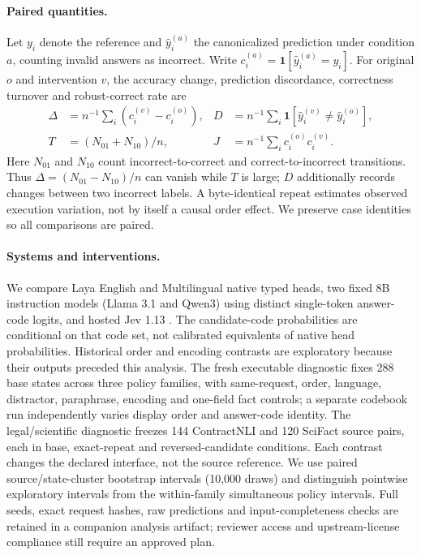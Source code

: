 \paragraph{Paired quantities.}
Let $y_i$ denote the reference and $\hat y_i^{(a)}$ the canonicalized prediction under condition $a$, counting invalid answers as incorrect. Write $c_i^{(a)}=\mathbf 1[\hat y_i^{(a)}=y_i]$. For original $o$ and intervention $v$, the accuracy change, prediction discordance, correctness turnover and robust-correct rate are
\begin{align}
\Delta &= n^{-1}\textstyle\sum_i(c_i^{(v)}-c_i^{(o)}), &
D &= n^{-1}\textstyle\sum_i\mathbf 1[\hat y_i^{(v)}\ne\hat y_i^{(o)}],\\
T &= (N_{01}+N_{10})/n, &
J &= n^{-1}\textstyle\sum_i c_i^{(o)}c_i^{(v)}.
\end{align}
Here $N_{01}$ and $N_{10}$ count incorrect-to-correct and correct-to-incorrect transitions. Thus $\Delta=(N_{01}-N_{10})/n$ can vanish while $T$ is large; $D$ additionally records changes between two incorrect labels. A byte-identical repeat estimates observed execution variation, not by itself a causal order effect. We preserve case identities so all comparisons are paired.

\paragraph{Systems and interventions.}
We compare Laya English and Multilingual native typed heads, two fixed 8B instruction models (Llama 3.1 and Qwen3) using distinct single-token answer-code logits, and hosted Jev 1.13 \citep{layamodel,jevdocs}. The candidate-code probabilities are conditional on that code set, not calibrated equivalents of native head probabilities. Historical order and encoding contrasts are exploratory because their outputs preceded this analysis. The fresh executable diagnostic fixes 288 base states across three policy families, with same-request, order, language, distractor, paraphrase, encoding and one-field fact controls; a separate codebook run independently varies display order and answer-code identity. The legal/scientific diagnostic freezes 144 ContractNLI and 120 SciFact source pairs, each in base, exact-repeat and reversed-candidate conditions. Each contrast changes the declared interface, not the source reference. We use paired source/state-cluster bootstrap intervals (10,000 draws) and distinguish pointwise exploratory intervals from the within-family simultaneous policy intervals. Full seeds, exact request hashes, raw predictions and input-completeness checks are retained in a companion analysis artifact; reviewer access and upstream-license compliance still require an approved plan.
